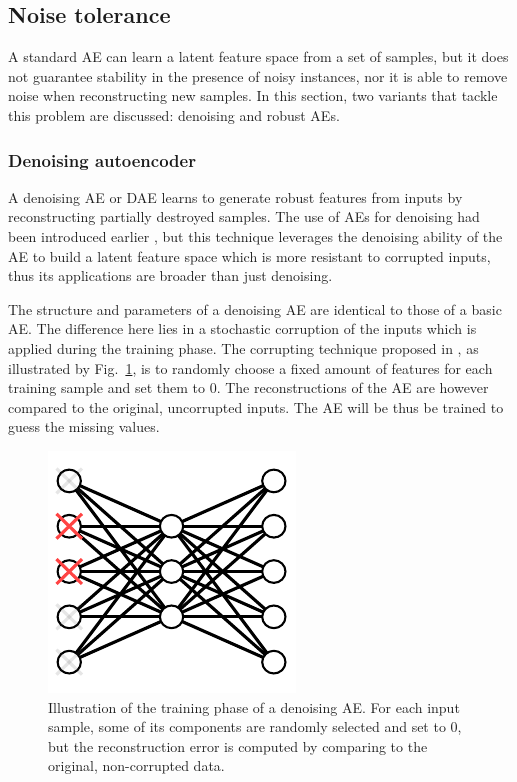 \subsection{Noise tolerance}\label{p1Sec.NoiseTolerance}

A standard AE can learn a latent feature space from a set of samples, but it does not guarantee stability in the presence of noisy instances, nor it is able to remove noise when reconstructing new samples. In this section, two variants that tackle this problem are discussed: denoising and robust AEs.

\subsubsection{Denoising autoencoder}

A denoising AE or DAE  learns to generate robust features from inputs by reconstructing partially destroyed samples. The use of AEs for denoising had been introduced earlier , but this technique leverages the denoising ability of the AE to build a latent feature space which is more resistant to corrupted inputs, thus its applications are broader than just denoising. 

The structure and parameters of a denoising AE are identical to those of a basic AE. The difference here lies in a stochastic corruption of the inputs which is applied during the training phase. The corrupting technique proposed in , as illustrated by Fig.~\ref{p1Fig.Denoising}, is to randomly choose a fixed amount of features for each training sample and set them to 0. The reconstructions of the AE are however compared to the original, uncorrupted inputs. The AE will be thus be trained to guess the missing values.

\begin{figure}[ht!]
	\centering
	\includegraphics[width=0.7\linewidth]{Denoising.pdf} 

	\caption[Illustration of the training phase of a denoising AE.]{Illustration of the training phase of a denoising AE. For each input sample, some of its components are randomly selected and set to 0, but the reconstruction error is computed by comparing to the original, non-corrupted data.}
	\label{p1Fig.Denoising}
\end{figure}

